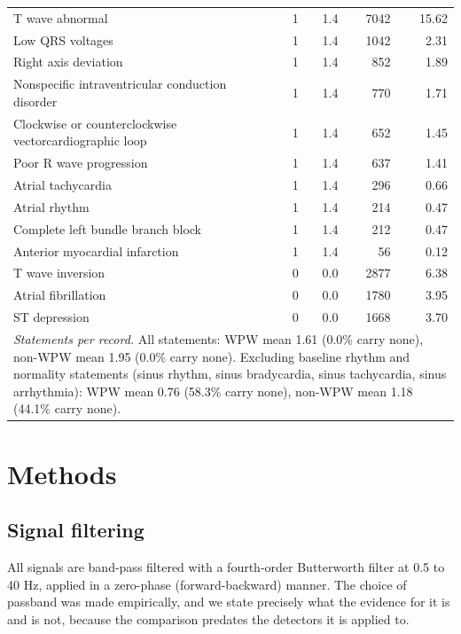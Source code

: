 \documentclass[11pt]{article}
\begin{document}
\begin{table}[htbp]
\begin{tabular}{lrrrr}
T wave abnormal & 1 & 1.4 & 7042 & 15.62 \\
Low QRS voltages & 1 & 1.4 & 1042 & 2.31 \\
Right axis deviation & 1 & 1.4 & 852 & 1.89 \\
Nonspecific intraventricular conduction disorder & 1 & 1.4 & 770 & 1.71 \\
Clockwise or counterclockwise vectorcardiographic loop & 1 & 1.4 & 652 & 1.45 \\
Poor R wave progression & 1 & 1.4 & 637 & 1.41 \\
Atrial tachycardia & 1 & 1.4 & 296 & 0.66 \\
Atrial rhythm & 1 & 1.4 & 214 & 0.47 \\
Complete left bundle branch block & 1 & 1.4 & 212 & 0.47 \\
Anterior myocardial infarction & 1 & 1.4 & 56 & 0.12 \\
T wave inversion & 0 & 0.0 & 2877 & 6.38 \\
Atrial fibrillation & 0 & 0.0 & 1780 & 3.95 \\
ST depression & 0 & 0.0 & 1668 & 3.70 \\
\midrule
\multicolumn{5}{p{0.92\linewidth}}{\emph{Statements per record.} All statements: WPW mean 1.61 (0.0\% carry none), non-WPW mean 1.95 (0.0\% carry none). Excluding baseline rhythm and normality statements (sinus rhythm, sinus bradycardia, sinus tachycardia, sinus arrhythmia): WPW mean 0.76 (58.3\% carry none), non-WPW mean 1.18 (44.1\% carry none).} \\
\bottomrule
\end{tabular}
\end{table}

\FloatBarrier
\section{Methods}
\label{sec:methods}

\subsection{Signal filtering}
\label{sec:filter}

All signals are band-pass filtered with a fourth-order Butterworth filter at 0.5 to 40 Hz, applied in a zero-phase (forward-backward) manner. The choice of passband was made empirically, and we state precisely what the evidence for it is and is not, because the comparison predates the detectors it is applied to.
\end{document}
